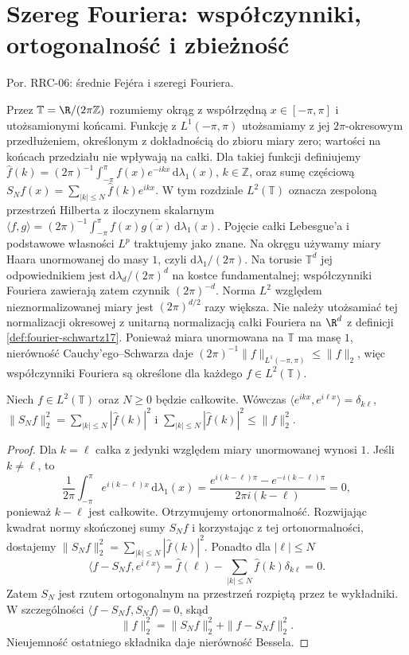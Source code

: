 \setcounter{section}{12}
\section{Szereg Fouriera: współczynniki, ortogonalność i zbieżność}
\label{sec:dt-series-fourier}
\providecommand{\atlasref}[2]{#2}

Por. \atlasref{PDE-06::thm:pde6-fejer}{RRC-06: średnie Fejéra i szeregi Fouriera}.


Przez $\mathbb T=\R/(2\pi\mathbb Z)$ rozumiemy okrąg z
współrzędną $x\in[-\pi,\pi]$ i utożsamionymi końcami.
Funkcję z $L^1(-\pi,\pi)$ utożsamiamy z jej
$2\pi$-okresowym przedłużeniem, określonym z dokładnością
do zbioru miary zero; wartości na końcach przedziału
nie wpływają na całki. Dla takiej funkcji definiujemy
$\widehat f(k)=(2\pi)^{-1}\int_{-\pi}^{\pi}f(x)e^{-ikx}\,\mathrm d\lambda_1(x)$,
$k\in\mathbb Z$, oraz sumę częściową
$S_Nf(x)=\sum_{|k|\le N}\widehat f(k)e^{ikx}$.
W tym rozdziale $L^2(\mathbb T)$ oznacza zespoloną przestrzeń Hilberta
z iloczynem skalarnym
$\langle f,g\rangle=(2\pi)^{-1}\int_{-\pi}^{\pi}f(x)\overline{g(x)}\,\mathrm d\lambda_1(x)$.
Pojęcie całki Lebesgue'a i podstawowe własności $L^p$
traktujemy jako znane. Na okręgu używamy miary Haara
unormowanej do masy $1$, czyli $\mathrm d\lambda_1/(2\pi)$.
Na torusie $\mathbb T^d$ jej odpowiednikiem jest
$\mathrm d\lambda_d/(2\pi)^d$ na kostce fundamentalnej;
współczynniki Fouriera zawierają zatem czynnik $(2\pi)^{-d}$.
Norma $L^2$ względem nieznormalizowanej miary jest
$(2\pi)^{d/2}$ razy większa. Nie należy utożsamiać tej
normalizacji okresowej z unitarną normalizacją całki
Fouriera na $\R^d$ z definicji \ref{def:fourier-schwartz17}.
Ponieważ miara unormowana na
$\mathbb T$ ma masę $1$, nierówność Cauchy'ego--Schwarza
daje $(2\pi)^{-1}\|f\|_{L^1(-\pi,\pi)}\leq\|f\|_2$,
więc współczynniki Fouriera są określone dla każdego
$f\in L^2(\mathbb T)$.

\begin{lemat}
\label{lem:dt-series-bessel}
Niech $f\in L^2(\mathbb T)$ oraz $N\geq0$ będzie całkowite. Wówczas
$\langle e^{ikx},e^{i\ell x}\rangle=\delta_{k\ell}$,
$\|S_Nf\|_2^2=\sum_{|k|\le N}|\widehat f(k)|^2$ i
$\sum_{|k|\le N}|\widehat f(k)|^2\le\|f\|_2^2$.
\end{lemat}
\begin{proof}
Dla $k=\ell$ całka z jedynki względem miary
unormowanej wynosi $1$. Jeśli $k\ne\ell$, to
\[
 \frac1{2\pi}\int_{-\pi}^{\pi}e^{i(k-\ell)x}\,
 \mathrm d\lambda_1(x)
 =\frac{e^{i(k-\ell)\pi}-e^{-i(k-\ell)\pi}}
 {2\pi i(k-\ell)}=0,
\]
ponieważ $k-\ell$ jest całkowite. Otrzymujemy
ortonormalność. Rozwijając kwadrat normy skończonej
sumy $S_Nf$ i korzystając z tej ortonormalności,
dostajemy $\|S_Nf\|_2^2=\sum_{|k|\le N}|\widehat f(k)|^2$.
Ponadto dla $|\ell|\leq N$
\[
 \langle f-S_Nf,e^{i\ell x}\rangle
 =\widehat f(\ell)-\sum_{|k|\leq N}
 \widehat f(k)\delta_{k\ell}=0.
\]
Zatem $S_N$ jest rzutem ortogonalnym na przestrzeń
rozpiętą przez te wykładniki. W szczególności
$\langle f-S_Nf,S_Nf\rangle=0$, skąd
\[
 \|f\|_2^2=\|S_Nf\|_2^2+\|f-S_Nf\|_2^2.
\]
Nieujemność ostatniego składnika daje nierówność Bessela.
\end{proof}

